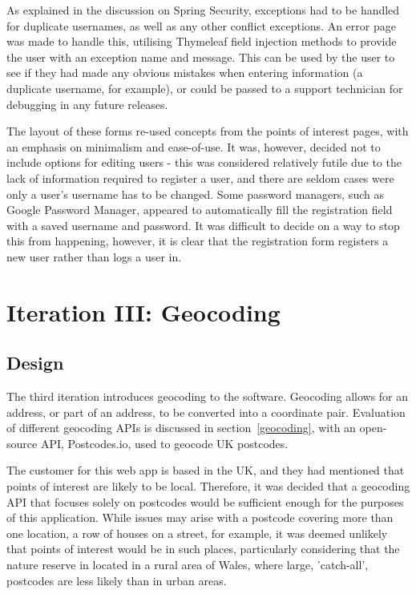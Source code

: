 As explained in the discussion on Spring Security, exceptions had to be handled for duplicate usernames, as well as any other conflict exceptions. An error page was made to handle this, utilising Thymeleaf field injection methods to provide the user with an exception name and message. This can be used by the user to see if they had made any obvious mistakes when entering information (a duplicate username, for example), or could be passed to a support technician for debugging in any future releases.

The layout of these forms re-used concepts from the points of interest pages, with an emphasis on minimalism and ease-of-use. It was, however, decided not to include options for editing users - this was considered relatively futile due to the lack of information required to register a user, and there are seldom cases were only a user's username has to be changed. Some password managers, such as Google Password Manager, appeared to automatically fill the registration field with a saved username and password. It was difficult to decide on a way to stop this from happening, however, it is clear that the registration form registers a new user rather than logs a user in.

\section{Iteration III: Geocoding}
\subsection{Design}

The third iteration introduces geocoding to the software. Geocoding allows for an address, or part of an address, to be converted into a coordinate pair. Evaluation of different geocoding APIs is discussed in section~\ref{geocoding}, with an open-source API, Postcodes.io, used to geocode UK postcodes.

The customer for this web app is based in the UK, and they had mentioned that points of interest are likely to be local. Therefore, it was decided that a geocoding API that focuses solely on postcodes would be sufficient enough for the purposes of this application. While issues may arise with a postcode covering more than one location, a row of houses on a street, for example, it was deemed unlikely that points of interest would be in such places, particularly considering that the nature reserve in located in a rural area of Wales, where large, 'catch-all', postcodes are less likely than in urban areas.

